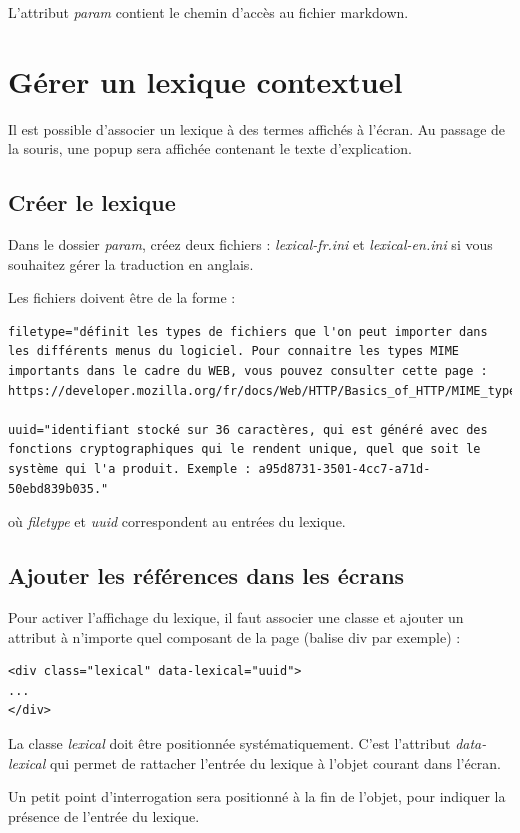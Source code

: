L'attribut \textit{param} contient le chemin d'accès au fichier markdown.

\section{Gérer un lexique contextuel}

Il est possible d'associer un lexique à des termes affichés à l'écran. Au passage de la souris, une popup sera affichée contenant le texte d'explication.

\subsection{Créer le lexique}

Dans le dossier \textit{param}, créez deux fichiers : \textit{lexical-fr.ini} et \textit{lexical-en.ini} si vous souhaitez gérer la traduction en anglais.

Les fichiers doivent être de la forme : 
\begin{lstlisting}
filetype="définit les types de fichiers que l'on peut importer dans les différents menus du logiciel. Pour connaitre les types MIME importants dans le cadre du WEB, vous pouvez consulter cette page :  https://developer.mozilla.org/fr/docs/Web/HTTP/Basics_of_HTTP/MIME_types/Common_types"

uuid="identifiant stocké sur 36 caractères, qui est généré avec des fonctions cryptographiques qui le rendent unique, quel que soit le système qui l'a produit. Exemple : a95d8731-3501-4cc7-a71d-50ebd839b035."
\end{lstlisting}

où \textit{filetype} et \textit{uuid} correspondent au entrées du lexique. 

\subsection{Ajouter les références dans les écrans}

Pour activer l'affichage du lexique, il faut associer une classe et ajouter un attribut à n'importe quel composant de la page (balise div par exemple) :

\begin{lstlisting}
<div class="lexical" data-lexical="uuid">
...
</div>
\end{lstlisting}

La classe \textit{lexical} doit être positionnée systématiquement. C'est l'attribut \textit{data-lexical} qui permet de rattacher l'entrée du lexique à l'objet courant dans l'écran.

Un petit point d'interrogation sera positionné à la fin de l'objet, pour indiquer la présence de l'entrée du lexique.